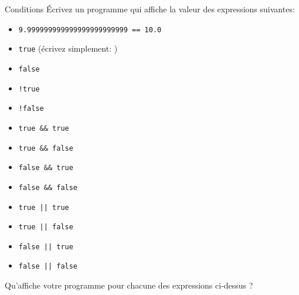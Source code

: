 \documentclass[a4paper,11pt]{article}
\begin{document}
	\begin{Exercice}{Conditions}
		\'Ecrivez un programme qui affiche la valeur des expressions suivantes:
		\begin{itemize}
			\item \texttt{9.999999999999999999999999 == 10.0}
			\item \texttt{true}  (écrivez simplement: )
			\item \texttt{false} 
			\item \texttt{!true} 
			\item \texttt{!false} 
			\item \texttt{true \&\& true} 
			\item \texttt{true \&\& false} 
			\item \texttt{false \&\& true} 
			\item \texttt{false \&\& false} 
			\item \texttt{true || true} 
			\item \texttt{true || false} 
			\item \texttt{false || true} 
			\item \texttt{false || false} 
		\end{itemize}
		
		Qu'affiche votre programme pour chacune des expressions ci-dessus ?
	\end{Exercice}
\end{document}

